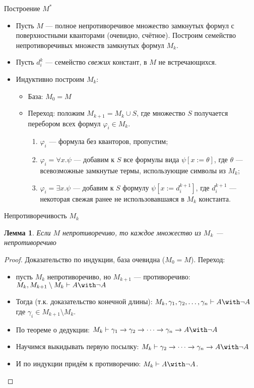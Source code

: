 \documentclass[aspectratio=169]{beamer}
\newtheorem{lmm}{Лемма}[section]
\begin{document}
\begin{frame}{Построение $M^*$}
\begin{itemize}
\item Пусть $M$ --- полное непротиворечивое множество замкнутых формул с поверхностными кванторами (очевидно, счётное). \pause
 Построим семейство непротиворечивых множеств замкнутых формул $M_k$.\pause
\item Пусть $d^k_i$ --- семейство \emph{свежих} констант, в $M$ не встречающихся.\pause
\item Индуктивно построим $M_k$:
\begin{itemize}
\item База: $M_0 = M$\pause
\item Переход: положим $M_{k+1} = M_k \cup S$, где множество $S$ получается перебором всех формул $\varphi_i \in M_k$.\pause
\begin{enumerate}
\item $\varphi_i$ --- формула без кванторов, пропустим;\pause
\item $\varphi_i = \forall x.\psi$ --- добавим к $S$ все формулы вида $\psi [x := \theta]$, где
$\theta$ --- всевозможные замкнутые термы, использующие символы из $M_k$;\pause
\item $\varphi_i = \exists x.\psi$ --- добавим к $S$ формулу $\psi [x := d^{k+1}_i]$, где $d^{k+1}_i$ --- некоторая
свежая ранее не использовавшаяся в $M_k$ константа.\pause
\end{enumerate}
\end{itemize}
\end{itemize}
\end{frame}

\begin{frame}{Непротиворечивость $M_k$}
\begin{lmm}Если $M$ непротиворечиво, то каждое множество из $M_k$ --- непротиворечиво\end{lmm}
\begin{proof}Доказательство по индукции, база очевидна ($M_0 = M$). \pause
Переход: \begin{itemize}
\item пусть $M_k$ непротиворечиво, но $M_{k+1}$ --- противоречиво: $M_k, M_{k+1}\setminus M_k \vdash A\with\neg A$ \pause
\item Тогда (т.к. доказательство конечной длины):
$M_k, \gamma_1, \gamma_2, \dots,\gamma_n\vdash A\with\neg A$
где $\gamma_i \in M_{k+1}\setminus M_k$. \pause
\item По теореме о дедукции: $M_k\vdash \gamma_1\to\gamma_2\to\dots\to\gamma_n\to A\with\neg A$ \pause
\item Научимся выкидывать первую посылку: $M_k\vdash \gamma_2\to\dots\to\gamma_n\to A\with\neg A$ \pause
\item И по индукции придём к противоречию: $M_k \vdash A\with\neg A$.
\end{itemize}

\end{proof}
\end{frame}
\end{document}
